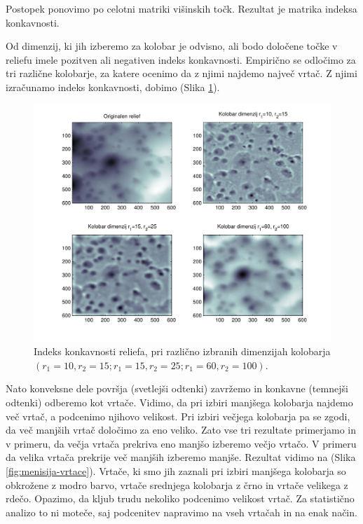 \documentclass[a4paper, twoside, 12pt]{book}
\begin{document}
Postopek ponovimo po celotni matriki višinskih točk. Rezultat je matrika indeksa konkavnosti.

Od dimenzij, ki jih izberemo za kolobar je odvisno, ali bodo določene točke v reliefu imele pozitven ali negativen indeks konkavnosti. Empirično se odločimo za tri različne kolobarje, za katere ocenimo da z njimi najdemo največ vrtač. Z njimi izračunamo indeks konkavnosti, dobimo (Slika \ref{fig:concavity-samples}).

  \begin{figure}[h!]
    \begin{center}
      \includegraphics[width=12cm]{slike/concavity-samples}
    \end{center}
    \caption{Indeks konkavnosti reliefa, pri različno izbranih dimenzijah kolobarja $(r_1=10,r_2=15;r_1=15,r_2=25;r_1=60,r_2=100)$.}
    \label{fig:concavity-samples}
  \end{figure}

Nato konveksne dele površja (svetlejši odtenki) zavržemo in konkavne (temnejši odtenki) odberemo kot vrtače. Vidimo, da pri izbiri manjšega kolobarja najdemo več vrtač, a podcenimo njihovo velikost. Pri izbiri večjega kolobarja pa se zgodi, da več manjših vrtač določimo za eno veliko. Zato vse tri rezultate primerjamo in v primeru, da večja vrtača prekriva eno manjšo izberemo večjo vrtačo. V primeru da velika vrtača prekrije več manjših izberemo manjše.
Rezultat vidimo na (Slika \ref{fig:menisija-vrtace}). Vrtače, ki smo jih zaznali pri izbiri manjšega kolobarja so obkrožene z modro barvo, vrtače srednjega kolobarja z črno in vrtače velikega z rdečo. Opazimo, da kljub trudu nekoliko podcenimo velikost vrtač. Za statistično analizo to ni moteče, saj podcenitev napravimo na vseh vrtačah in na enak način.
\end{document}
